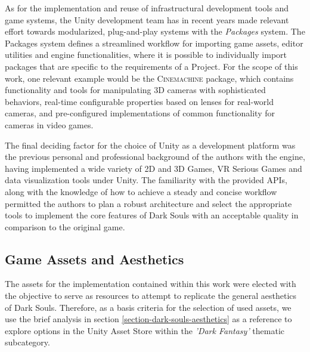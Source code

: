 \documentclass[cic,tc,english]{iiufrgs}
\begin{document}
As for the implementation and reuse of infrastructural development tools and game systems, the Unity development team has in recent years made relevant effort towards modularized, plug-and-play systems with the \emph{Packages} system. The Packages system defines a streamlined workflow for importing game assets, editor utilities and engine functionalities, where it is possible to individually import packages that are specific to the requirements of a Project. For the scope of this work, one relevant example would be the \textsc{Cinemachine} package, which contains functionality and tools for manipulating 3D cameras with sophisticated behaviors, real-time configurable properties based on lenses for real-world cameras, and pre-configured implementations of common functionality for cameras in video games.

The final deciding factor for the choice of Unity as a development platform was the previous personal and professional background of the authors with the engine, having implemented a wide variety of 2D and 3D Games, VR Serious Games and data visualization tools under Unity. The familiarity with the provided APIs, along with the knowledge of how to achieve a steady and concise workflow permitted the authors to plan a robust architecture and select the appropriate tools to implement the core features of Dark Souls with an acceptable quality in comparison to the original game.

\subsection{Game Assets and Aesthetics}

The assets for the implementation contained within this work were elected with the objective to serve as resources to attempt to replicate the general aesthetics of Dark Souls. Therefore, as a basis criteria for the selection of used assets, we use the brief analysis in section \ref{section-dark-souls-aesthetics} as a reference to explore options in the Unity Asset Store within the \emph{'Dark Fantasy'} thematic subcategory.
\end{document}
